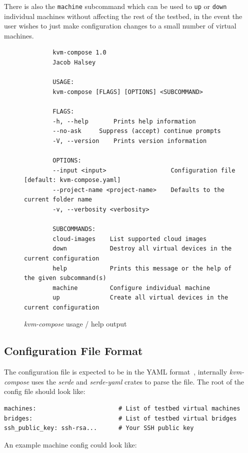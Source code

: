 \documentclass[
    author={Jacob Daniel Halsey},
    supervisor={Prof. Awais Rashid},
    degree={BSc},
    title={Building a Testbed for Evaluating Privacy Enhancing Technologies  (PETs)},
    subtitle={},
    type={software development},
    year={2021}
]{dissertation}
\begin{document}
There is also the \texttt{machine} subcommand which can be used to \texttt{up} or \texttt{down} individual machines
without affecting the rest of the testbed, in the event the user wishes to just make configuration changes
to a small number of virtual machines.

\begin{figure}
	\begin{verbatim}
		kvm-compose 1.0
		Jacob Halsey
		
		USAGE:
		kvm-compose [FLAGS] [OPTIONS] <SUBCOMMAND>
		
		FLAGS:
		-h, --help       Prints help information
		--no-ask     Suppress (accept) continue prompts
		-V, --version    Prints version information
		
		OPTIONS:
		--input <input>                  Configuration file [default: kvm-compose.yaml]
		--project-name <project-name>    Defaults to the current folder name
		-v, --verbosity <verbosity>          
		
		SUBCOMMANDS:
		cloud-images    List supported cloud images
		down            Destroy all virtual devices in the current configuration
		help            Prints this message or the help of the given subcommand(s)
		machine         Configure individual machine
		up              Create all virtual devices in the current configuration
	\end{verbatim}
	\caption{\emph{kvm-compose} usage / help output}
	\label{fig:kvm_compose_usage}
\end{figure}

\subsection{Configuration File Format}

The configuration file is expected to be in the YAML format~\cite{yaml}, internally \emph{kvm-compose}
uses the \emph{serde} and \emph{serde-yaml} crates to parse the file.
The root of the config file should look like:

\begin{verbatim}
machines:                       # List of testbed virtual machines
bridges:                        # List of testbed virtual bridges
ssh_public_key: ssh-rsa...      # Your SSH public key
\end{verbatim}

An example machine config could look like:
\end{document}
